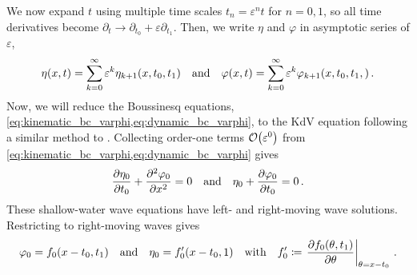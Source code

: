 \documentclass{jfm}
\renewcommand*{\epsilon}{\varepsilon}
\begin{document}
We now expand $t$ using multiple time scales $t_n =
\epsilon^n t$ for $n= 0,1$, so all time derivatives become $\partial_t \to
\partial_{t_0} + \epsilon \partial_{t_1}$.
Then, we write $\eta$ and $\varphi$ in asymptotic series of $\epsilon$,
\begin{equation}
  \eta(x,t) = \sum_{k=0}^{\infty} \epsilon^k
    \eta_{k+1}(x,t_0,t_1) \qq{and}
  \varphi(x,t) = \sum_{k=0}^{\infty} \epsilon^k
    \varphi_{k+1}(x,t_0,t_1,) \,.
\end{equation}
Now, we will reduce the Boussinesq equations,
\cref{eq:kinematic_bc_varphi,eq:dynamic_bc_varphi}, to the KdV equation
following a similar method to \citet{mei2005nonlinear}.
Collecting order-one terms $\order{\epsilon^0}$ from
\cref{eq:kinematic_bc_varphi,eq:dynamic_bc_varphi} gives
\begin{equation}
  \pdv{\eta_0}{t_0} + \pdv[2]{\varphi_0}{x} = 0 \qq{and}
  \eta_0 + \pdv{\varphi_0}{t_0} = 0 \,.
\end{equation}
These shallow-water wave equations have left- and right-moving wave
solutions.
Restricting to right-moving waves gives
\begin{equation}
  \varphi_0 = f_0(x-t_0,t_1) \qq{and}
  \eta_0 = f'_0(x-t_0,1) \qq{with}
  f_0' \coloneqq \eval{\pdv{f_0(\theta,t_1)}{\theta}}_{\theta = x-t_0} \,.
\end{equation}
\end{document}
